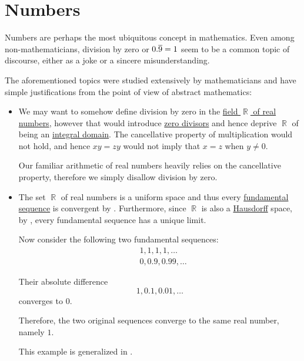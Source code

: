 \section{Numbers}\label{sec:numbers}

Numbers are perhaps the most ubiquitous concept in mathematics. Even among non-mathematicians, division by zero or \( 0.\oline{9} = 1 \) seem to be a common topic of discourse, either as a joke or a sincere misunderstanding.

The aforementioned topics were studied extensively by mathematicians and have simple justifications from the point of view of abstract mathematics:
\begin{itemize}
  \item We may want to somehow define division by zero in the \hyperref[def:real_numbers]{field \( \BbbR \) of real numbers}, however that would introduce \hyperref[def:divisibility/zero]{zero divisors} and hence deprive \( \BbbR \) of being an \hyperref[def:integral_domain]{integral domain}. The cancellative property of multiplication would not hold, and hence \( xy = zy \) would not imply that \( x = z \) when \( y \neq 0 \).

  Our familiar arithmetic of real numbers heavily relies on the cancellative property, therefore we simply disallow division by zero.

  \item The set \( \BbbR \) of real numbers is a uniform space and thus every \hyperref[def:fundamental_net]{fundamental sequence} is convergent by . Furthermore, since \( \BbbR \) is also a \hyperref[def:separation_axioms/T2]{Hausdorff} space, by , every fundamental sequence has a unique limit.

  Now consider the following two fundamental sequences:
  \begin{align*}
    &1, 1, 1, 1, \ldots \\
    &0, 0.9, 0.99, \ldots
  \end{align*}

  Their absolute difference
  \begin{equation*}
    1, 0.1, 0.01, \ldots
  \end{equation*}
  converges to \( 0 \).

  Therefore, the two original sequences converge to the same real number, namely \( 1 \).

  This example is generalized in .
\end{itemize}

